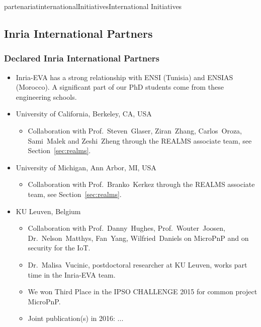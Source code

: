 \documentclass{ra2016}
\begin{document}
\begin{module}{partenariat}{internationalInitiatives}{International Initiatives}
\subsection{Inria International Partners}

	\subsubsection{Declared Inria International Partners}

\begin{itemize}
    
    \item Inria-EVA has a strong relationship with ENSI (Tunisia) and ENSIAS (Morocco).
        A significant part of our PhD students come from these engineering schools. 
    
    \item University of California, Berkeley, CA, USA
        \begin{itemize}
            \item Collaboration with Prof.~Steven~Glaser, Ziran~Zhang, Carlos~Oroza, Sami~Malek and Zeshi~Zheng through the REALMS associate team, see Section~\ref{sec:realms}.
        \end{itemize}
    
    \item University of Michigan, Ann Arbor, MI, USA
        \begin{itemize}
            \item Collaboration with Prof.~Branko~Kerkez through the REALMS associate team, see Section~\ref{sec:realms}.
        \end{itemize}
    
    \item KU Leuven, Belgium
        \begin{itemize}
            \item Collaboration with Prof.~Danny~Hughes, Prof.~Wouter~Joosen, Dr.~Nelson~Matthys, Fan~Yang, Wilfried~Daniels on MicroPnP and on security for the IoT.
            \item Dr.~Malisa~Vucinic, postdoctoral researcher at KU Leuven, works part time in the Inria-EVA team.
            \item We won Third Place in the IPSO CHALLENGE 2015 for common project MicroPnP.
            \item Joint publication(s) in 2016: ... 
        \end{itemize}
    

\end{itemize}
\end{module}
\end{document}
